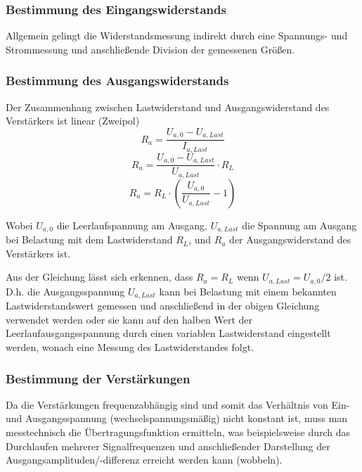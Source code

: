 \subsubsection{Bestimmung des Eingangswiderstands}
Allgemein gelingt die Widerstandsmessung indirekt durch eine Spannungs- und
Strommessung und anschließende Division der gemessenen Größen. 

\subsubsection{Bestimmung des Ausgangswiderstands}
Der Zusammenhang zwischen Lastwiderstand und Ausgangswiderstand des Verstärkers
ist linear (Zweipol)
\[R_a = \frac{U_{a,0} - U_{a,Last}}{I_{a,Last}}\]
\[R_a = \frac{U_{a,0} - U_{a,Last}}{U_{a,Last}} \cdot R_L\]
\[R_a = R_L \cdot \left(\frac{U_{a,0}}{U_{a,Last}}-1 \right)\]

Wobei $U_{a,0}$ die Leerlaufspannung am Ausgang, $U_{a,Last}$ die
Spannung am Ausgang bei Belastung mit dem Lastwiderstand $R_L$, und $R_a$ der
Ausgangswiderstand des Verstärkers ist.

Aus der Gleichung lässt sich erkennen, dass $R_a = R_L$ wenn $U_{a,Last} =
U_{a,0}/2$ ist. D.h. die Ausgangsspannung $U_{a,Last}$ kann bei
Belastung mit einem bekannten Lastwiderstandswert gemessen und anschließend in
der obigen Gleichung verwendet werden oder sie kann auf den halben Wert der
Leerlaufausgangsspannung durch einen variablen Lastwiderstand eingestellt
werden, wonach eine Messung des Lastwiderstandes folgt.


\subsubsection{Bestimmung der Verstärkungen}
Da die Verstärkungen frequenzabhängig sind und somit das Verhältnis von Ein- und
Ausgangsspannung (wechselspannungsmäßig) nicht konstant ist, muss man messtechnisch die
Übertragungsfunktion ermitteln, was beispielsweise durch das Durchlaufen mehrerer
Signalfrequenzen und anschließender Darstellung der
Ausgangsamplituden/-differenz erreicht werden kann (wobbeln). 